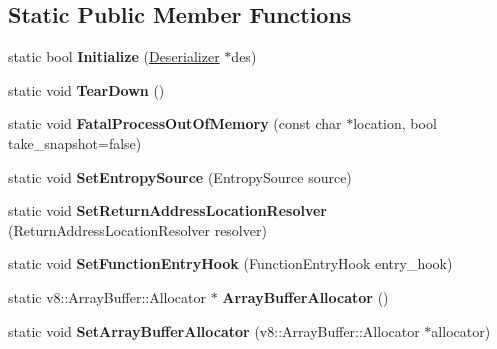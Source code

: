 \subsection*{Static Public Member Functions}
\begin{DoxyCompactItemize}
\item 
\hypertarget{classv8_1_1internal_1_1_v8_a5408ad1990bca8d3ee76e83420a958e3}{}static bool {\bfseries Initialize} (\hyperlink{classv8_1_1internal_1_1_deserializer}{Deserializer} $\ast$des)\label{classv8_1_1internal_1_1_v8_a5408ad1990bca8d3ee76e83420a958e3}

\item 
\hypertarget{classv8_1_1internal_1_1_v8_a216fa3810e9a2014d650162e53bc3576}{}static void {\bfseries Tear\+Down} ()\label{classv8_1_1internal_1_1_v8_a216fa3810e9a2014d650162e53bc3576}

\item 
\hypertarget{classv8_1_1internal_1_1_v8_a66df0d97df1caffc2db63ea3ee1e68d6}{}static void {\bfseries Fatal\+Process\+Out\+Of\+Memory} (const char $\ast$location, bool take\+\_\+snapshot=false)\label{classv8_1_1internal_1_1_v8_a66df0d97df1caffc2db63ea3ee1e68d6}

\item 
\hypertarget{classv8_1_1internal_1_1_v8_aed648e804c48796d2b6c871845c79f07}{}static void {\bfseries Set\+Entropy\+Source} (Entropy\+Source source)\label{classv8_1_1internal_1_1_v8_aed648e804c48796d2b6c871845c79f07}

\item 
\hypertarget{classv8_1_1internal_1_1_v8_a87af3b08b5e5982d00da44c027916f15}{}static void {\bfseries Set\+Return\+Address\+Location\+Resolver} (Return\+Address\+Location\+Resolver resolver)\label{classv8_1_1internal_1_1_v8_a87af3b08b5e5982d00da44c027916f15}

\item 
\hypertarget{classv8_1_1internal_1_1_v8_a1036b185505ca4b98e36ea73d889defa}{}static void {\bfseries Set\+Function\+Entry\+Hook} (Function\+Entry\+Hook entry\+\_\+hook)\label{classv8_1_1internal_1_1_v8_a1036b185505ca4b98e36ea73d889defa}

\item 
\hypertarget{classv8_1_1internal_1_1_v8_a6d4f18cf00ebf95f8667474a1165c151}{}static v8\+::\+Array\+Buffer\+::\+Allocator $\ast$ {\bfseries Array\+Buffer\+Allocator} ()\label{classv8_1_1internal_1_1_v8_a6d4f18cf00ebf95f8667474a1165c151}

\item 
\hypertarget{classv8_1_1internal_1_1_v8_abf0419a2dcf4f277d9b83bb32b0b8bb7}{}static void {\bfseries Set\+Array\+Buffer\+Allocator} (v8\+::\+Array\+Buffer\+::\+Allocator $\ast$allocator)\label{classv8_1_1internal_1_1_v8_abf0419a2dcf4f277d9b83bb32b0b8bb7}


\end{DoxyCompactItemize}
